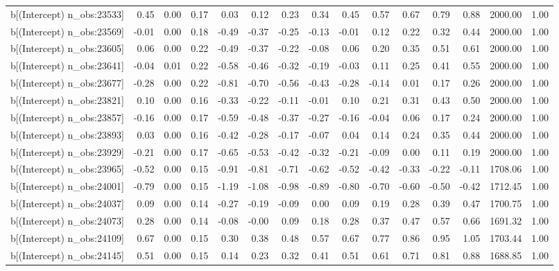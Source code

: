 \begin{table}[ht]
\begin{tabular}{rrrrrrrrrrrrrrr}
  b[(Intercept) n\_obs:23533] & 0.45 & 0.00 & 0.17 & 0.03 & 0.12 & 0.23 & 0.34 & 0.45 & 0.57 & 0.67 & 0.79 & 0.88 & 2000.00 & 1.00 \\ 
  b[(Intercept) n\_obs:23569] & -0.01 & 0.00 & 0.18 & -0.49 & -0.37 & -0.25 & -0.13 & -0.01 & 0.12 & 0.22 & 0.32 & 0.44 & 2000.00 & 1.00 \\ 
  b[(Intercept) n\_obs:23605] & 0.06 & 0.00 & 0.22 & -0.49 & -0.37 & -0.22 & -0.08 & 0.06 & 0.20 & 0.35 & 0.51 & 0.61 & 2000.00 & 1.00 \\ 
  b[(Intercept) n\_obs:23641] & -0.04 & 0.01 & 0.22 & -0.58 & -0.46 & -0.32 & -0.19 & -0.03 & 0.11 & 0.25 & 0.41 & 0.55 & 2000.00 & 1.00 \\ 
  b[(Intercept) n\_obs:23677] & -0.28 & 0.00 & 0.22 & -0.81 & -0.70 & -0.56 & -0.43 & -0.28 & -0.14 & 0.01 & 0.17 & 0.26 & 2000.00 & 1.00 \\ 
  b[(Intercept) n\_obs:23821] & 0.10 & 0.00 & 0.16 & -0.33 & -0.22 & -0.11 & -0.01 & 0.10 & 0.21 & 0.31 & 0.43 & 0.50 & 2000.00 & 1.00 \\ 
  b[(Intercept) n\_obs:23857] & -0.16 & 0.00 & 0.17 & -0.59 & -0.48 & -0.37 & -0.27 & -0.16 & -0.04 & 0.06 & 0.17 & 0.24 & 2000.00 & 1.00 \\ 
  b[(Intercept) n\_obs:23893] & 0.03 & 0.00 & 0.16 & -0.42 & -0.28 & -0.17 & -0.07 & 0.04 & 0.14 & 0.24 & 0.35 & 0.44 & 2000.00 & 1.00 \\ 
  b[(Intercept) n\_obs:23929] & -0.21 & 0.00 & 0.17 & -0.65 & -0.53 & -0.42 & -0.32 & -0.21 & -0.09 & 0.00 & 0.11 & 0.19 & 2000.00 & 1.00 \\ 
  b[(Intercept) n\_obs:23965] & -0.52 & 0.00 & 0.15 & -0.91 & -0.81 & -0.71 & -0.62 & -0.52 & -0.42 & -0.33 & -0.22 & -0.11 & 1708.06 & 1.00 \\ 
  b[(Intercept) n\_obs:24001] & -0.79 & 0.00 & 0.15 & -1.19 & -1.08 & -0.98 & -0.89 & -0.80 & -0.70 & -0.60 & -0.50 & -0.42 & 1712.45 & 1.00 \\ 
  b[(Intercept) n\_obs:24037] & 0.09 & 0.00 & 0.14 & -0.27 & -0.19 & -0.09 & 0.00 & 0.09 & 0.19 & 0.28 & 0.39 & 0.47 & 1700.75 & 1.00 \\ 
  b[(Intercept) n\_obs:24073] & 0.28 & 0.00 & 0.14 & -0.08 & -0.00 & 0.09 & 0.18 & 0.28 & 0.37 & 0.47 & 0.57 & 0.66 & 1691.32 & 1.00 \\ 
  b[(Intercept) n\_obs:24109] & 0.67 & 0.00 & 0.15 & 0.30 & 0.38 & 0.48 & 0.57 & 0.67 & 0.77 & 0.86 & 0.95 & 1.05 & 1703.44 & 1.00 \\ 
  b[(Intercept) n\_obs:24145] & 0.51 & 0.00 & 0.15 & 0.14 & 0.23 & 0.32 & 0.41 & 0.51 & 0.61 & 0.71 & 0.81 & 0.88 & 1688.85 & 1.00 \\ 

\end{tabular}
\end{table}
